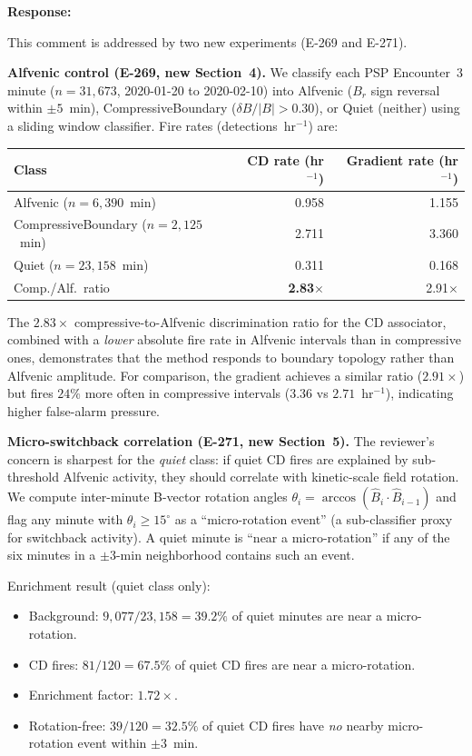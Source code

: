 \documentclass{article}
\newenvironment{authorresponse}{%
  \vspace{0.3em}
  \noindent\textbf{Response:}\hspace{0.5em}
}{%
  \vspace{0.5em}\par
}
\begin{document}
\begin{authorresponse}
This comment is addressed by two new experiments (E-269 and E-271).

\textbf{Alfvenic control (E-269, new Section~4).}
We classify each PSP Encounter~3 minute ($n = 31{,}673$, 2020-01-20 to
2020-02-10) into Alfvenic ($B_r$ sign reversal within $\pm 5$~min),
CompressiveBoundary ($\delta B/|B| > 0.30$), or Quiet (neither) using a
sliding window classifier.  Fire rates (detections~hr$^{-1}$) are:

\smallskip
\begin{center}
\small
\begin{tabular}{lrr}
\toprule
Class & CD rate (hr$^{-1}$) & Gradient rate (hr$^{-1}$) \\
\midrule
Alfvenic ($n=6{,}390$~min)           & 0.958 & 1.155 \\
CompressiveBoundary ($n=2{,}125$~min) & 2.711 & 3.360 \\
Quiet ($n=23{,}158$~min)              & 0.311 & 0.168 \\
\midrule
Comp./Alf.\ ratio                    & \textbf{2.83$\times$} & 2.91$\times$ \\
\bottomrule
\end{tabular}
\end{center}
\smallskip

The $2.83\times$ compressive-to-Alfvenic discrimination ratio for the CD
associator, combined with a \textit{lower} absolute fire rate in Alfvenic
intervals than in compressive ones, demonstrates that the method responds
to boundary topology rather than Alfvenic amplitude.  For comparison, the
gradient achieves a similar ratio ($2.91\times$) but fires $24\%$ more
often in compressive intervals ($3.36$ vs $2.71$~hr$^{-1}$), indicating
higher false-alarm pressure.

\textbf{Micro-switchback correlation (E-271, new Section~5).}
The reviewer's concern is sharpest for the \textit{quiet} class: if quiet CD
fires are explained by sub-threshold Alfvenic activity, they should correlate
with kinetic-scale field rotation.  We compute inter-minute B-vector rotation
angles $\theta_i = \arccos(\hat{B}_i \cdot \hat{B}_{i-1})$ and flag any
minute with $\theta_i \geq 15^{\circ}$ as a ``micro-rotation event'' (a
sub-classifier proxy for switchback activity).  A quiet minute is ``near a
micro-rotation'' if any of the six minutes in a $\pm 3$-min neighborhood
contains such an event.

Enrichment result (quiet class only):
\begin{itemize}
  \item Background: $9{,}077/23{,}158 = 39.2\%$ of quiet minutes are near a
    micro-rotation.
  \item CD fires: $81/120 = 67.5\%$ of quiet CD fires are near a
    micro-rotation.
  \item Enrichment factor: $\mathbf{1.72\times}$.
  \item Rotation-free: $39/120 = 32.5\%$ of quiet CD fires have \textit{no}
    nearby micro-rotation event within $\pm 3$~min.
\end{itemize}


\end{authorresponse}
\end{document}
